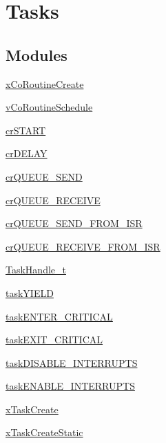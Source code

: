 \hypertarget{group___tasks}{}\section{Tasks}
\label{group___tasks}
\subsection*{Modules}
\begin{DoxyCompactItemize}
\item 
\hyperlink{group__x_co_routine_create}{x\+Co\+Routine\+Create}
\item 
\hyperlink{group__v_co_routine_schedule}{v\+Co\+Routine\+Schedule}
\item 
\hyperlink{group__cr_s_t_a_r_t}{cr\+S\+T\+A\+RT}
\item 
\hyperlink{group__cr_d_e_l_a_y}{cr\+D\+E\+L\+AY}
\item 
\hyperlink{group__cr_q_u_e_u_e___s_e_n_d}{cr\+Q\+U\+E\+U\+E\+\_\+\+S\+E\+ND}
\item 
\hyperlink{group__cr_q_u_e_u_e___r_e_c_e_i_v_e}{cr\+Q\+U\+E\+U\+E\+\_\+\+R\+E\+C\+E\+I\+VE}
\item 
\hyperlink{group__cr_q_u_e_u_e___s_e_n_d___f_r_o_m___i_s_r}{cr\+Q\+U\+E\+U\+E\+\_\+\+S\+E\+N\+D\+\_\+\+F\+R\+O\+M\+\_\+\+I\+SR}
\item 
\hyperlink{group__cr_q_u_e_u_e___r_e_c_e_i_v_e___f_r_o_m___i_s_r}{cr\+Q\+U\+E\+U\+E\+\_\+\+R\+E\+C\+E\+I\+V\+E\+\_\+\+F\+R\+O\+M\+\_\+\+I\+SR}
\item 
\hyperlink{group___task_handle__t}{Task\+Handle\+\_\+t}
\item 
\hyperlink{group__task_y_i_e_l_d}{task\+Y\+I\+E\+LD}
\item 
\hyperlink{group__task_e_n_t_e_r___c_r_i_t_i_c_a_l}{task\+E\+N\+T\+E\+R\+\_\+\+C\+R\+I\+T\+I\+C\+AL}
\item 
\hyperlink{group__task_e_x_i_t___c_r_i_t_i_c_a_l}{task\+E\+X\+I\+T\+\_\+\+C\+R\+I\+T\+I\+C\+AL}
\item 
\hyperlink{group__task_d_i_s_a_b_l_e___i_n_t_e_r_r_u_p_t_s}{task\+D\+I\+S\+A\+B\+L\+E\+\_\+\+I\+N\+T\+E\+R\+R\+U\+P\+TS}
\item 
\hyperlink{group__task_e_n_a_b_l_e___i_n_t_e_r_r_u_p_t_s}{task\+E\+N\+A\+B\+L\+E\+\_\+\+I\+N\+T\+E\+R\+R\+U\+P\+TS}
\item 
\hyperlink{group__x_task_create}{x\+Task\+Create}
\item 
\hyperlink{group__x_task_create_static}{x\+Task\+Create\+Static}
\item 

\end{DoxyCompactItemize}
